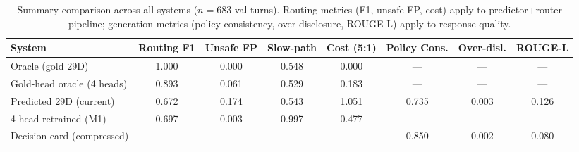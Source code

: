 \begin{table}[t]
\centering
\caption{Summary comparison across all systems ($n{=}683$ val turns). Routing metrics (F1, unsafe FP, cost) apply to predictor+router pipeline; generation metrics (policy consistency, over-disclosure, ROUGE-L) apply to response quality.}
\label{tab:summary_comparison}
\small
\begin{tabular}{@{}lccccccc@{}}
\toprule
\textbf{System} & \textbf{Routing F1} & \textbf{Unsafe FP} & \textbf{Slow-path} & \textbf{Cost (5:1)} & \textbf{Policy Cons.} & \textbf{Over-disl.} & \textbf{ROUGE-L} \\
\midrule
Oracle (gold 29D) & 1.000 & 0.000 & 0.548 & 0.000 & --- & --- & --- \\
Gold-head oracle (4 heads) & 0.893 & 0.061 & 0.529 & 0.183 & --- & --- & --- \\
Predicted 29D (current) & 0.672 & 0.174 & 0.543 & 1.051 & 0.735 & 0.003 & 0.126 \\
4-head retrained (M1) & 0.697 & 0.003 & 0.997 & 0.477 & --- & --- & --- \\
Decision card (compressed) & --- & --- & --- & --- & 0.850 & 0.002 & 0.080 \\
\bottomrule
\end{tabular}
\end{table}
